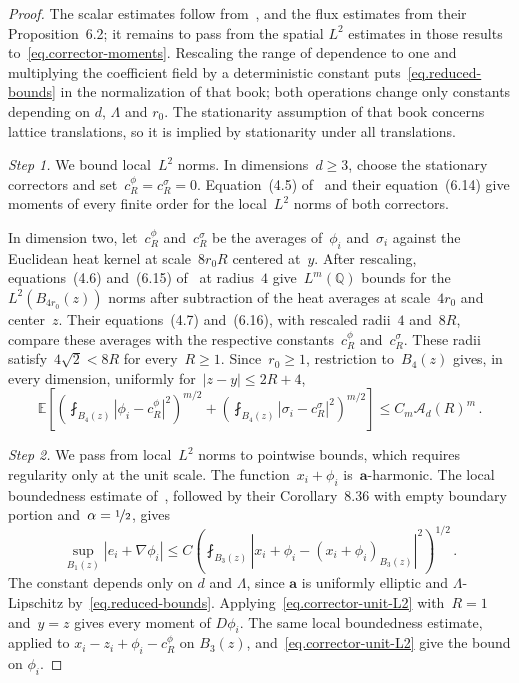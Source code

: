 \documentclass[11pt]{amsart}
\newcommand{\nf}{\nicefrac}
\theoremstyle{definition}
\theoremstyle{remark}
\numberwithin{equation}{section}
\newcommand{\E}{\mathbb E}
\newcommand{\Q}{\mathbb Q}
\renewcommand{\a}{\mathbf a}
\newcommand{\cA}{\mathcal A}
\begin{document}
\begin{proof}
The scalar estimates follow from~\citet[Theorem~4.1]{AKM2019book}, and the flux estimates from their Proposition~6.2; it remains to pass from the spatial $L^2$ estimates in those results to~\eqref{eq.corrector-moments}. Rescaling the range of dependence to one and multiplying the coefficient field by a deterministic constant puts~\eqref{eq.reduced-bounds} in the normalization of that book; both operations change only constants depending on $d$, $\Lambda$ and $r_0$. The stationarity assumption of that book concerns lattice translations, so it is implied by stationarity under all translations.

\emph{Step 1.} We bound local~$L^2$ norms. In dimensions~$d\geq3$, choose the stationary correctors and set~$c_R^\phi=c_R^\sigma=0$. Equation~(4.5) of~\citet{AKM2019book} and their equation~(6.14) give moments of every finite order for the local~$L^2$ norms of both correctors.

In dimension two, let~$c_R^\phi$ and~$c_R^\sigma$ be the averages of~$\phi_i$ and~$\sigma_i$ against the Euclidean heat kernel at scale~$8r_0R$ centered at~$y$. After rescaling, equations~(4.6) and~(6.15) of~\citet{AKM2019book} at radius~$4$ give~$L^m(\Q)$ bounds for the~$L^2(B_{4r_0}(z))$ norms after subtraction of the heat averages at scale~$4r_0$ and center~$z$. Their equations~(4.7) and~(6.16), with rescaled radii~$4$ and~$8R$, compare these averages with the respective constants~$c_R^\phi$ and~$c_R^\sigma$. These radii satisfy~$4\sqrt{2}<8R$ for every~$R\geq1$. Since~$r_0\geq1$, restriction to~$B_4(z)$ gives, in every dimension, uniformly for~$|z-y|\leq2R+4$,
\begin{equation}\label{eq.corrector-unit-L2}
 \E\left[\left(\fint_{B_4(z)}|\phi_i-c_R^\phi|^2\right)^{m/2}
 +\left(\fint_{B_4(z)}|\sigma_i-c_R^\sigma|^2\right)^{m/2}\right]
 \leq C_m\cA_d(R)^m\, .
\end{equation}

\emph{Step 2.} We pass from local~$L^2$ norms to pointwise bounds, which requires regularity only at the unit scale. The function~$x_i+\phi_i$ is~$\a$-harmonic. The local boundedness estimate of~\citet*[Theorem~8.17]{GilbargTrudinger2001}, followed by their Corollary~8.36 with empty boundary portion and~$\alpha=\nf{1}{2}$, gives
\begin{equation*}
 \sup_{B_1(z)}|e_i+\nabla\phi_i|
 \leq C\left(\fint_{B_3(z)}|x_i+\phi_i-(x_i+\phi_i)_{B_3(z)}|^2\right)^{1/2}\, .
\end{equation*}
The constant depends only on $d$ and $\Lambda$, since $\a$ is uniformly elliptic and $\Lambda$-Lipschitz by~\eqref{eq.reduced-bounds}. Applying~\eqref{eq.corrector-unit-L2} with~$R=1$ and~$y=z$ gives every moment of $D\phi_i$. The same local boundedness estimate, applied to $x_i-z_i+\phi_i-c_R^\phi$ on $B_3(z)$, and~\eqref{eq.corrector-unit-L2} give the bound on $\phi_i$.


\end{proof}
\end{document}
